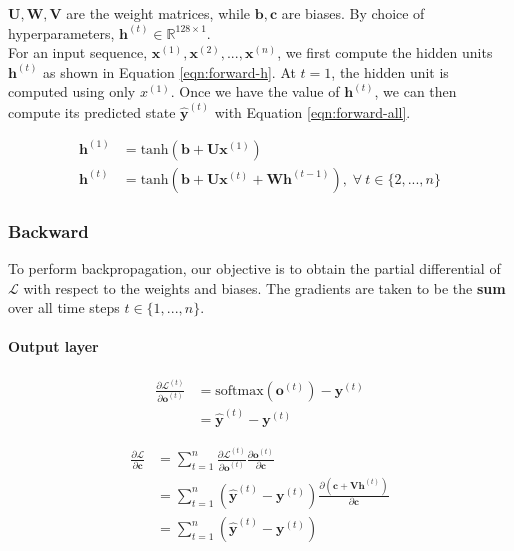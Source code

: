 \documentclass{article}
\numberwithin{equation}{section}
\begin{document}
$\bm{U}, \bm{W}, \bm{V}$ are the weight matrices, while $\bm{b}, \bm{c}$ are biases. By choice of hyperparameters, $\bm{h}^{(t)} \in \mathbb{R}^{128\times1}$. \\

For an input sequence, $\bm{x}^{(1)}, \bm{x}^{(2)}, ..., \bm{x}^{(n)}$, we first compute the hidden units $\bm{h}^{(t)}$ as shown in Equation \ref{eqn:forward-h}. At $t=1$, the hidden unit is computed using only $x^{(1)}$. Once we have the value of $\bm{h}^{(t)}$, we can then compute its predicted state $\hat{\bm{y}}^{(t)}$ with Equation \ref{eqn:forward-all}.

\begin{equation}
\label{eqn:forward-h}
\begin{split}
	\bm{h}^{(1)} &= \text{tanh}(\bm{b} + \bm{U}\bm{x}^{(1)}) \\
	\bm{h}^{(t)} &= \text{tanh}(\bm{b} + \bm{U}\bm{x}^{(t)} + \bm{W}\bm{h}^{(t-1)}),\;
		\forall\: t \in \{2, ..., n\}
\end{split}
\end{equation}

\subsubsection{Backward}
To perform backpropagation, our objective is to obtain the partial differential of $\mathcal{L}$ with respect to the weights and biases. The gradients are taken to be the \textbf{sum} over all time steps $t \in \{1, ..., n\}$.

\paragraph{Output layer}
\begin{equation}
\label{eqn:backward-o}
\begin{split}
	\frac{\partial \mathcal{L}^{(t)}}{\partial \bm{o}^{(t)}}
		&= \text{softmax}(\bm{o}^{(t)}) - \bm{y}^{(t)} \\
		&= \hat{\bm{y}}^{(t)} - \bm{y}^{(t)}
\end{split}
\end{equation}

\begin{equation}
\label{eqn:backward-c}
\begin{split}
	\frac{\partial \mathcal{L}}{\partial \bm{c}}
		&= \sum_{t=1}^n \frac{\partial \mathcal{L}^{(t)}}{\partial \bm{o}^{(t)}} \frac{\partial \bm{o}^{(t)}}{\partial \bm{c}} \\
		&= \sum_{t=1}^n (\hat{\bm{y}}^{(t)} - \bm{y}^{(t)}) \frac{\partial(\bm{c} + \bm{V}\bm{h}^{(t)})}{\partial \bm{c}} \\
		&= \sum_{t=1}^n (\hat{\bm{y}}^{(t)} - \bm{y}^{(t)})
\end{split}
\end{equation}
\end{document}
